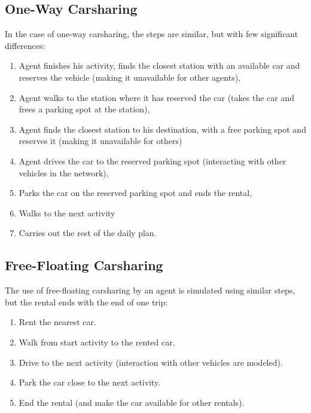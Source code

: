 \subsection{One-Way Carsharing}
In the case of one-way carsharing, the steps are similar, but with few significant differences:
\begin{enumerate}\styleEnumerate
	\item Agent finishes his activity, finds the closest station with an available car and reserves the vehicle (making it unavailable for other agents),
	\item Agent walks to the station where it has reserved the car (takes the car and frees a parking spot at the station),
	\item Agent finds the closest station to his destination, with a free parking spot and reserves it (making it unavailable for others)
	\item Agent drives the car to the reserved parking spot (interacting with other vehicles in the network),
	\item Parks the car on the reserved parking spot and ends the rental,
	\item Walks to the next activity
	\item Carries out the rest of the daily plan.
\end{enumerate}

\subsection{Free-Floating Carsharing}
The use of free-floating carsharing by an agent is simulated using similar steps, but the rental ends with the end of one trip:
\begin{enumerate}\styleEnumerate
	\item Rent the nearest car.
	\item	Walk from start activity to the rented car.
	\item	Drive to the next activity (interaction with other vehicles are modeled).
	\item	Park the car close to the next activity.
	\item	End the rental (and make the car available for other rentals).
\end{enumerate}

